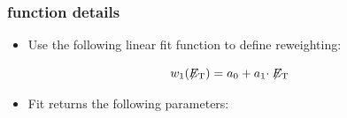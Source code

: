 \documentclass[bigger]{beamer}
\begin{document}
\begin{frame}
\frametitle{\met function details}
\label{sec-1-9-4}
\label{sec-1-9-4-1}

\centering
\begin{itemize}
\item Use the following linear fit function to define \met reweighting:
\end{itemize}
\centering
\begin{equation*}
w_1(\not\!\!{E_{\text{T}}}) = a_0 + a_1 \cdot \not\!\!{E_{\text{T}}}
\end{equation*}
\begin{itemize}
\item Fit returns the following parameters:
\end{itemize}
\end{frame}
\end{document}
